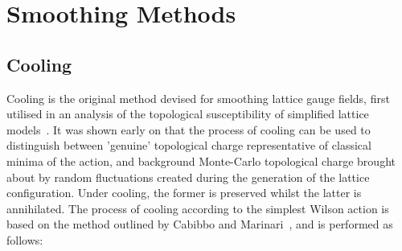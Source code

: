 \section{Smoothing Methods}
\subsection{Cooling}
Cooling is the original method devised for smoothing lattice gauge fields, first utilised in an analysis of the topological susceptibility of simplified lattice models~\cite{Berg:1981nw}. It was shown early on that the process of cooling can be used to distinguish between 'genuine' topological charge representative of classical minima of the action, and background Monte-Carlo topological charge brought about by random fluctuations created during the generation of the lattice configuration. Under cooling, the former is preserved whilst the latter is annihilated. The process of cooling according to the simplest Wilson action is based on the method outlined by Cabibbo and Marinari~\cite{Cabibbo:1982zn,Creutz:1980zw}, and is performed as follows:\\

